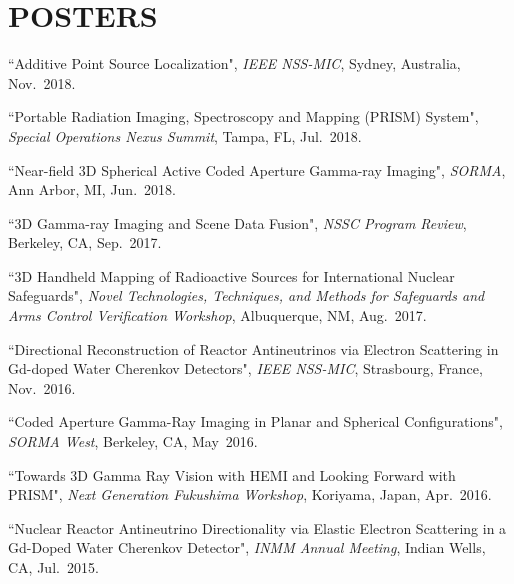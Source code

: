 \section{\small{POSTERS}}

\vspace{10pt}
\begin{enumerate}[label={[\arabic*]}, leftmargin=*, labelsep=10pt, align=left]
    \item ``Additive Point Source Localization", \emph{IEEE NSS-MIC}, Sydney, Australia, Nov.~2018.
    \item ``Portable Radiation Imaging, Spectroscopy and Mapping (PRISM) System", \emph{Special Operations Nexus Summit}, Tampa, FL, Jul.~2018.
    \item ``Near-field 3D Spherical Active Coded Aperture Gamma-ray Imaging", \emph{SORMA}, Ann Arbor, MI, Jun.~2018.
    \item ``3D Gamma-ray Imaging and Scene Data Fusion", \emph{NSSC Program Review}, Berkeley, CA, Sep.~2017.
    \item ``3D Handheld Mapping of Radioactive Sources for International Nuclear Safeguards", \emph{Novel Technologies, Techniques, and Methods for Safeguards and Arms Control Verification Workshop}, Albuquerque, NM, Aug.~2017.
    \item ``Directional Reconstruction of Reactor Antineutrinos via Electron Scattering in Gd-doped Water Cherenkov Detectors", \emph{IEEE NSS-MIC}, Strasbourg, France, Nov.~2016.
    \item ``Coded Aperture Gamma-Ray Imaging in Planar and Spherical Configurations", \emph{SORMA West}, Berkeley, CA, May~2016.
    \item ``Towards 3D Gamma Ray Vision with HEMI and Looking Forward with PRISM", \emph{Next Generation Fukushima Workshop}, Koriyama, Japan, Apr.~2016.
    \item ``Nuclear Reactor Antineutrino Directionality via Elastic Electron Scattering in a Gd-Doped Water Cherenkov Detector", \emph{INMM Annual Meeting}, Indian Wells, CA, Jul.~2015.
\end{enumerate}
